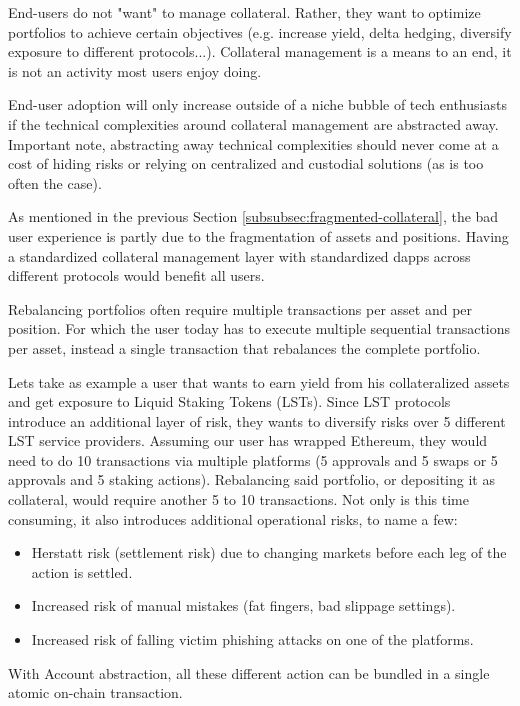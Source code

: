 \documentclass[sigconf,nonacm]{acmart}
\begin{document}
End-users do not "want" to manage collateral.
Rather, they want to optimize portfolios to achieve certain objectives (e.g. increase yield, delta hedging, diversify exposure to different protocols...).
Collateral management is a means to an end, it is not an activity most users enjoy doing.

End-user adoption will only increase outside of a niche bubble of tech enthusiasts if the technical complexities around collateral management are abstracted away.
Important note, abstracting away technical complexities should never come at a cost of hiding risks or relying on centralized and custodial solutions (as is too often the case).

As mentioned in the previous Section \ref{subsubsec:fragmented-collateral}, the bad user experience is partly due to the fragmentation of assets and positions.
Having a standardized collateral management layer with standardized dapps across different protocols would benefit all users.

Rebalancing portfolios often require multiple transactions per asset and per position.
For which the user today has to execute multiple sequential transactions per asset, instead a single transaction that rebalances the complete portfolio.

Lets take as example a user that wants to earn yield from his collateralized assets and get exposure to Liquid Staking Tokens (LSTs).
Since LST protocols introduce an additional layer of risk, they wants to diversify risks over 5 different LST service providers.
Assuming our user has wrapped Ethereum, they would need to do 10 transactions via multiple platforms (5 approvals and 5 swaps or 5 approvals and 5 staking actions).
Rebalancing said portfolio, or depositing it as collateral, would require another 5 to 10 transactions.
Not only is this time consuming, it also introduces additional operational risks, to name a few:
 \begin{itemize}
    \item Herstatt risk (settlement risk) due to changing markets before each leg of the action is settled.
    \item Increased risk of manual mistakes (fat fingers, bad slippage settings).
    \item Increased risk of falling victim phishing attacks on one of the platforms. 
\end{itemize}
With Account abstraction, all these different action can be bundled in a single atomic on-chain transaction.
\end{document}
